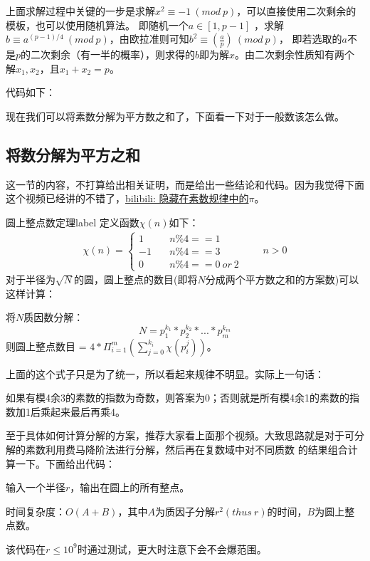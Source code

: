 上面求解过程中关键的一步是求解$x^2\equiv -1 \ (mod \ p)$，可以直接使用二次剩余的模板，也可以使用随机算法。
即随机一个$a∈[1,p-1]$ ，求解$b\equiv a^{(p-1)/4}\ (mod\ p)$，由欧拉准则可知$b^2\equiv (\frac{a}{p}) \ (mod\ p)$，
即若选取的$a$不是$p$的二次剩余（有一半的概率），则求得的$b$即为解$x$。由二次剩余性质知有两个解$x_1,x_2$，且$x_1+x_2=p$。

代码如下：


现在我们可以将素数分解为平方数之和了，下面看一下对于一般数该怎么做。

\subsection{将数分解为平方之和}
这一节的内容，不打算给出相关证明，而是给出一些结论和代码。因为我觉得下面这个视频已经讲的不错了，\href{https://www.bilibili.com/video/av12131743}{bilibili: 隐藏在素数规律中的$\pi$}。

\begin{theorem}{圆上整点数定理}{label}
	定义函数$\chi(n)$如下：
	\begin{align*}
		\chi(n) = \left\{\begin{matrix}
		1&  \quad  n\%4==1\\
		-1  & \quad  n\%4==3 \\
		0 &\quad   n\%4==0\ or\ 2
		\end{matrix}\right. \quad\quad n>0
	\end{align*}
	对于半径为$\sqrt{N}$的圆，圆上整点的数目(即将$N$分成两个平方数之和的方案数)可以这样计算：
	
	将$N$质因数分解：
	$$
	N = p_1^{k_1}*p_2^{k_2}*...*p_m^{k_m}
	$$
	则圆上整点数目 = $4*\Pi_{i=1}^{m}(\sum_{j=0}^{k_i}\chi(p_i^j))$。
	
	上面的这个式子只是为了统一，所以看起来规律不明显。实际上一句话：
	
	如果有模4余3的素数的指数为奇数，则答案为0；否则就是所有模4余1的素数的指数加1后乘起来最后再乘4。
\end{theorem}

\vbox{}

至于具体如何计算分解的方案，推荐大家看上面那个视频。大致思路就是对于可分解的素数利用费马降阶法进行分解，然后再在复数域中对不同质数
的结果组合计算一下。下面给出代码：

输入一个半径$r$，输出在圆上的所有整点。

{\heiti 时间复杂度：$O(A+B)$，其中$A$为质因子分解$r^2(thus\ r)$的时间，$B$为圆上整点数。

该代码在$r\le 10^9$时通过测试，更大时注意下会不会爆范围。}

